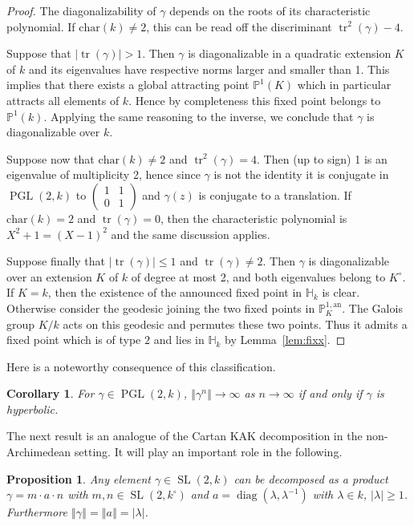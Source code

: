 \documentclass[11pt]{article}
\newtheorem{prop}[theo]{Proposition}
\newtheorem{coro}[theo]{Corollary}
\theoremstyle{definition}
\numberwithin{equation}{section}
\numberwithin{figure}{section}
\numberwithin{table}{section}
\DeclareMathOperator{\tr}{tr}
\DeclareMathOperator{\SL}{SL}
\DeclareMathOperator{\PGL}{PGL}
\DeclareMathOperator{\diag}{diag}
\newcommand{\hh}{\mathbb{H}}
\newcommand{\an}{\mathrm{an}}
\newcommand{\cv}{\rightarrow}
\newcommand{\norm}[1]{\left\Vert#1\right\Vert}
\newcommand{\abs}[1]{\left\vert#1\right\vert}
\newcommand{\pu}{{\mathbb{P}^1}}
\newcommand{\PP}{\mathbb{P}}
\newcommand{\lrpar}[1]{\left(#1\right)}
\newcommand{\PGLk}{\PGL(2, k)}
\begin{document}
\begin{proof}
The diagonalizability of $\gamma$ depends on the roots of its characteristic polynomial.
If $\mathrm{char}(k)\neq 2$, this can be read off the discriminant $\tr^2(\gamma)-4$.

Suppose that $\mathopen|\tr(\gamma)\mathclose| >1$. Then $\gamma$ is diagonalizable in a quadratic extension $K$ of $k$ and its eigenvalues have respective norms larger and smaller than 1. This implies that there exists a global attracting point $\PP^1(K)$ which in particular attracts all elements of $k$. Hence by completeness this fixed point belongs to $\pu(k)$. Applying the same reasoning to the inverse, we conclude that $\gamma$ is diagonalizable over $k$.


Suppose now that $\mathrm{char}(k)\neq 2$ and $\tr^2(\gamma) =4$. Then (up to sign) 1 is an eigenvalue of multiplicity 2, hence since $\gamma$ is not the identity it is conjugate in $\PGLk$ to $\lrpar{
\begin{smallmatrix} 1& 1 \\ 0& 1
\end{smallmatrix}}$ and $\gamma(z)$ is conjugate to a translation.
If $\mathrm{char}(k)=2$ and $\tr(\gamma) = 0$, then the characteristic polynomial is $X^2+1 = (X-1)^2$ and the same discussion applies.

Suppose finally that $\mathopen|\tr(\gamma)\mathclose|\leq 1$ and $\tr(\gamma) \neq 2$. Then $\gamma$ is diagonalizable over an extension $K$ of $k$ of degree at most 2, and both eigenvalues belong to $K^\circ$. If $K=k$, then the existence of the announced fixed point in $\hh_k$ is clear. Otherwise consider the geodesic joining the two fixed points in $\PP^{1,\an}_K$. The Galois group $K/k$ acts on this geodesic and permutes these two points. Thus it admits a fixed point which is of type $2$ and lies in $\hh_k$ by Lemma~\ref{lem:fixx}.
\end{proof}

Here is a noteworthy consequence of this classification.

\begin{coro}
For $\gamma\in \PGLk$, $\norm{\gamma^n} \to \infty$ as $n\cv\infty$ if and only if $\gamma$ is hyperbolic.
\end{coro}

The next result is an analogue of the Cartan KAK decomposition in the non-Archimedean setting. It will play an important role in the following.

\begin{prop}\label{prop:KAK}
Any element $\gamma\in \SL(2,k)$ can be decomposed as a product $\gamma= m\cdot a \cdot n$ with $m,n \in \SL(2,k^\circ)$ and $a = \diag (\lambda, \lambda^{-1})$ with $\lambda\in k$, $|\lambda|\ge 1$. Furthermore $\norm{\gamma} = \norm{a} = \abs{\lambda}$.
\end{prop}
\end{document}
